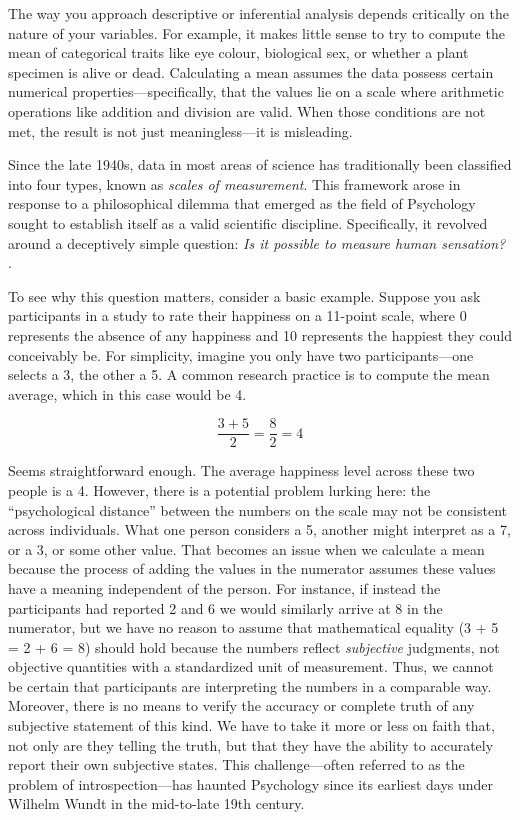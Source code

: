 The way you approach descriptive or inferential analysis depends critically on the nature of your variables. For example, it makes little sense to try to compute the mean of categorical traits like eye colour, biological sex, or whether a plant specimen is alive or dead. Calculating a mean assumes the data possess certain numerical properties—specifically, that the values lie on a scale where arithmetic operations like addition and division are valid. When those conditions are not met, the result is not just meaningless—it is misleading.

Since the late 1940s, data in most areas of science has traditionally been classified into four types, known as \textit{scales of measurement}. This framework arose in response to a philosophical dilemma that emerged as the field of Psychology sought to establish itself as a valid scientific discipline. Specifically, it revolved around a deceptively simple question: \textit{Is it possible to measure human sensation?} \parencite[p. 677]{Stevens1946}.

To see why this question matters, consider a basic example. Suppose you ask participants in a study to rate their happiness on a 11-point scale, where 0 represents the absence of any happiness and 10 represents the happiest they could
conceivably be. For simplicity, imagine you only have two participants—one selects a 3, the other a 5. A common research practice is to compute the mean average, which in this case would be 4. 

\begin{equation}
\frac{3 + 5}{2} = \frac{8}{2} = 4
\end{equation}

Seems straightforward enough. The average happiness level across these two people is a 4. However, there is a potential problem lurking here: the ``psychological distance'' between the numbers on the scale may not be consistent across individuals. What one person considers a 5, another might interpret as a 7, or a 3, or some other value. That becomes an issue when we calculate a mean because the process of adding the values in the numerator assumes these values have a meaning independent of the person. For instance, if instead the participants had reported 2 and 6 we would similarly arrive at 8 in the numerator, but we have no reason to assume that mathematical equality (3 + 5 = 2 + 6 = 8) should hold because the numbers reflect \textit{subjective} judgments, not objective quantities with a standardized unit of measurement. Thus, we cannot be certain that participants are interpreting the numbers in a comparable way. Moreover, there is no means to verify the accuracy or complete truth of any subjective statement of this kind. We have to take it more or less on faith that, not only are they telling the truth, but that they have the ability to accurately report their own subjective states. This challenge—often referred to as the problem of introspection—has haunted Psychology since its earliest days under Wilhelm Wundt in the mid-to-late 19th century. 

